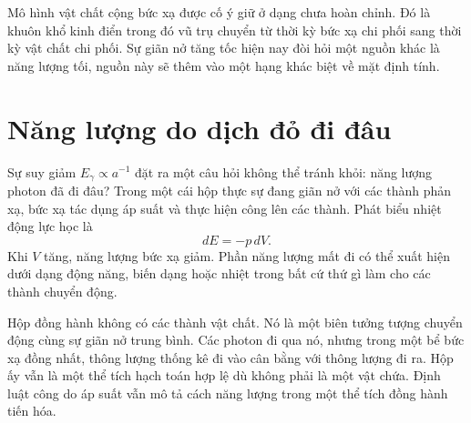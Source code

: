 \begin{classroomqa}
\end{classroomqa}

\begin{classroomqa}
\end{classroomqa}

Mô hình vật chất cộng bức xạ được cố ý giữ ở dạng chưa hoàn chỉnh. Đó là khuôn khổ kinh điển trong đó vũ trụ chuyển từ thời kỳ bức xạ chi phối sang thời kỳ vật chất chi phối. Sự giãn nở tăng tốc hiện nay đòi hỏi một nguồn khác là năng lượng tối, nguồn này sẽ thêm vào một hạng khác biệt về mặt định tính.

\section{Năng lượng do dịch đỏ đi đâu}

Sự suy giảm \(E_\gamma\propto a^{-1}\) đặt ra một câu hỏi không thể tránh khỏi: năng lượng photon đã đi đâu? Trong một cái hộp thực sự đang giãn nở với các thành phản xạ, bức xạ tác dụng áp suất và thực hiện công lên các thành. Phát biểu nhiệt động lực học là
\begin{equation}
dE=-p\,dV.
\label{eq:c02-pdv}
\end{equation}
Khi \(V\) tăng, năng lượng bức xạ giảm. Phần năng lượng mất đi có thể xuất hiện dưới dạng động năng, biến dạng hoặc nhiệt trong bất cứ thứ gì làm cho các thành chuyển động.

Hộp đồng hành không có các thành vật chất. Nó là một biên tưởng tượng chuyển động cùng sự giãn nở trung bình. Các photon đi qua nó, nhưng trong một bể bức xạ đồng nhất, thông lượng thống kê đi vào cân bằng với thông lượng đi ra. Hộp ấy vẫn là một thể tích hạch toán hợp lệ dù không phải là một vật chứa. Định luật công do áp suất vẫn mô tả cách năng lượng trong một thể tích đồng hành tiến hóa.

